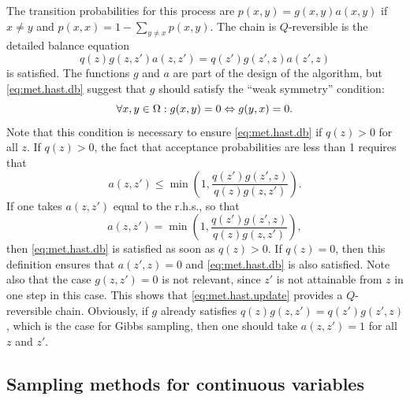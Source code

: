 The transition probabilities for this process are
$p(x,y) = g(x,y)a(x,y)$ if $x\neq y$ and 
$p(x,x) = 1-\sum_{y\neq x} p(x,y)$. The chain is $Q$-reversible is the 
detailed balance equation
\begin{equation}
\label{eq:met.hast.db}
q(z)g(z,z') a(z,z') = q(z')g(z',z)a(z',z)
\end{equation}
is satisfied. The functions $g$ and $a$ are part of the design of the algorithm, but \cref{eq:met.hast.db} suggest that $g$ should satisfy the ``weak
symmetry'' condition:
\begin{equation}
\label{eq:weak.sym}
\forall x,y\in \Omega: g(x,y) = 0 \Leftrightarrow g(y,x) = 0.
\end{equation}
Note that this condition is necessary to ensure \cref{eq:met.hast.db} if $q(z)>0$ for all $z$. If $q(z)>0$, the fact that acceptance probabilities are less than 1 requires that 
\[
a(z,z') \leq \min\left(1, \frac{q(z')g(z',z)}{q(z)g(z,z')}\right).
\]
If one takes $a(z,z')$ equal to the r.h.s., so that
\begin{equation}
\label{eq:met.hast.update}
a(z,z') = \min\left(1, \frac{q(z')g(z',z)}{q(z)g(z,z')}\right),
\end{equation}
then \cref{eq:met.hast.db} is satisfied as soon as  $q(z)>0$.  If $q(z) = 0$, then this definition ensures that $a(z', z) = 0$ and \cref{eq:met.hast.db} is also satisfied. Note also that the case $g(z, z') = 0$ is not relevant, since $z'$ is not attainable from $z$ in one step in this case. This shows that \cref{eq:met.hast.update} provides a $Q$-reversible chain. Obviously, if $g$ already satisfies $q(z)g(z,z') = q(z')g(z',z)$, which is the case for Gibbs sampling, then one should take $a(z,z') = 1$ for all $z$ and $z'$.  

\subsection{Sampling methods for continuous variables}
\label{sec:continuous.met}


